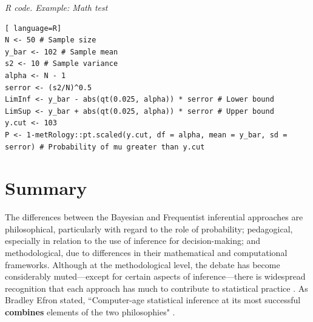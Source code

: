 \begin{tcolorbox}[enhanced,width=4.67in,center upper,
	fontupper=\large\bfseries,drop shadow southwest,sharp corners]
	\textit{R code. Example: Math test}
\begin{VF}
\begin{lstlisting}[ language=R]
N <- 50 # Sample size
y_bar <- 102 # Sample mean
s2 <- 10 # Sample variance
alpha <- N - 1
serror <- (s2/N)^0.5 
LimInf <- y_bar - abs(qt(0.025, alpha)) * serror # Lower bound
LimSup <- y_bar + abs(qt(0.025, alpha)) * serror # Upper bound
y.cut <- 103
P <- 1-metRology::pt.scaled(y.cut, df = alpha, mean = y_bar, sd = serror) # Probability of mu greater than y.cut
\end{lstlisting}
\end{VF}
\end{tcolorbox}



\section{Summary}\label{sec27}

The differences between the Bayesian and Frequentist inferential approaches are philosophical, particularly with regard to the role of probability; pedagogical, especially in relation to the use of inference for decision-making; and methodological, due to differences in their mathematical and computational frameworks. Although at the methodological level, the debate has become considerably muted—except for certain aspects of inference—there is widespread recognition that each approach has much to contribute to statistical practice \cite{Good1992, Bayarri2004, Kass2011}. As Bradley Efron stated, ``Computer-age statistical inference at its most successful \textbf{combines} elements of the two philosophies" \cite{efron2016computer}.

